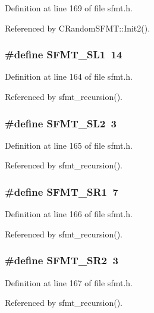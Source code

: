Definition at line 169 of file sfmt.\-h.



Referenced by C\-Random\-S\-F\-M\-T\-::\-Init2().

\subsubsection[{S\-F\-M\-T\-\_\-\-S\-L1}]{\setlength{\rightskip}{0pt plus 5cm}\#define S\-F\-M\-T\-\_\-\-S\-L1~14}\label{rnd_2sfmt_8h_a2c68781b722f0d3c86c935aa9ddd73aa}


Definition at line 164 of file sfmt.\-h.



Referenced by sfmt\-\_\-recursion().

\subsubsection[{S\-F\-M\-T\-\_\-\-S\-L2}]{\setlength{\rightskip}{0pt plus 5cm}\#define S\-F\-M\-T\-\_\-\-S\-L2~3}\label{rnd_2sfmt_8h_a82d22ea98c802146d90d0a7345d25fe7}


Definition at line 165 of file sfmt.\-h.



Referenced by sfmt\-\_\-recursion().

\subsubsection[{S\-F\-M\-T\-\_\-\-S\-R1}]{\setlength{\rightskip}{0pt plus 5cm}\#define S\-F\-M\-T\-\_\-\-S\-R1~7}\label{rnd_2sfmt_8h_a0c2deda4d85a03b21f941b951068db10}


Definition at line 166 of file sfmt.\-h.



Referenced by sfmt\-\_\-recursion().

\subsubsection[{S\-F\-M\-T\-\_\-\-S\-R2}]{\setlength{\rightskip}{0pt plus 5cm}\#define S\-F\-M\-T\-\_\-\-S\-R2~3}\label{rnd_2sfmt_8h_a5d78a3ac05f0e059ff793974c0faec76}


Definition at line 167 of file sfmt.\-h.



Referenced by sfmt\-\_\-recursion().

